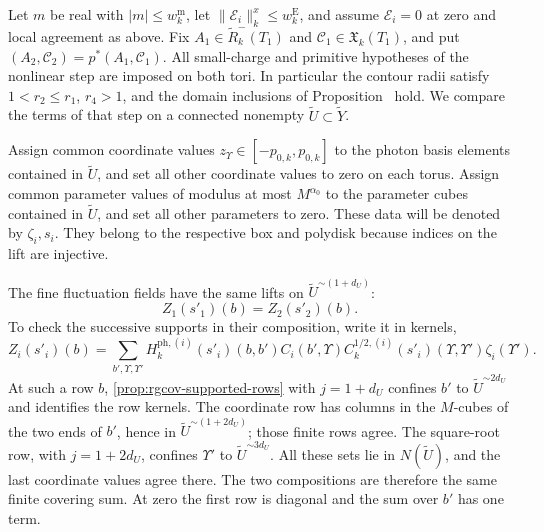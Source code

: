 Let $m$ be real with $|m|\le w_k^{\mathrm m}$, let
$\|\mathscr E_i\|_k^x\le w_k^{\mathrm E}$, and assume
$\mathscr E_i=0$ at zero and local agreement as above.
Fix $A_1\in\widetilde R_k^-(T_1)$ and
$\mathscr C_1\in\mathfrak X_k(T_1)$, and put
$(A_2,\mathscr C_2)=p^*(A_1,\mathscr C_1)$.
All small-charge and primitive hypotheses of the
nonlinear step are imposed on both tori.
In particular the contour radii satisfy
$1<r_2\le r_1$, $r_4>1$, and the domain inclusions
of Proposition~ hold.
We compare the terms of that step on a connected
nonempty $\widetilde U\subset\widetilde Y$.

Assign common coordinate values
$z_\Upsilon\in[-p_{0,k},p_{0,k}]$ to the photon basis
elements contained in $\widetilde U$, and set all
other coordinate values to zero on each torus.
Assign common parameter values of modulus at most
$M^{\alpha_0}$ to the parameter cubes contained in
$\widetilde U$, and set all other parameters to zero.
These data will be denoted by $\zeta_i,s_i$.
They belong to the respective box and polydisk
because indices on the lift are injective.

The fine fluctuation fields have the same lifts on
$\widetilde U^{\sim(1+d_U)}$:
\begin{equation}\label{eq:rgcov-fine-fluctuation}
                         Z_1(s'_1)(b)=Z_2(s'_2)(b).
\end{equation}
To check the successive supports in their composition,
write it in kernels,
\[
 Z_i(s'_i)(b)
  =\sum_{b',\Upsilon,\Upsilon'}
    H_k^{\mathrm{ph},(i)}(s'_i)(b,b')
          C_i(b',\Upsilon)
            C_k^{1/2,(i)}(s'_i)(\Upsilon,\Upsilon')\zeta_i(\Upsilon').
\]
At such a row $b$, \cref{prop:rgcov-supported-rows}
with $j=1+d_U$ confines $b'$ to
$\widetilde U^{\sim2d_U}$ and identifies the row kernels.
The coordinate row has columns in the $M$-cubes of
the two ends of $b'$, hence in
$\widetilde U^{\sim(1+2d_U)}$; those finite rows agree.
The square-root row, with $j=1+2d_U$, confines
$\Upsilon'$ to $\widetilde U^{\sim3d_U}$.
All these sets lie in $N(\widetilde U)$, and the
last coordinate values agree there.
The two compositions are therefore the same finite
covering sum. At zero the first row is diagonal
and the sum over $b'$ has one term.

